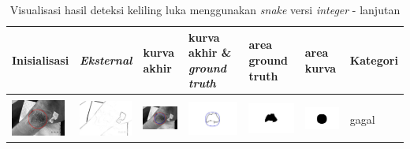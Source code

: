 \begin{table}[H]
	\centering
	\caption{Visualisasi hasil deteksi keliling luka menggunakan \emph{snake} versi \emph{integer} - lanjutan}
	\label{tabel_hasil_6.5}
	\begin{tabular}{|m{0.7in}|m{0.7in}|m{0.7in}|m{0.7in}|m{0.7in}|m{0.7in}|m{0.7in}|}
		\hline
		\textbf{Inisialisasi} & \textbf{\emph{Eksternal}} & \textbf{kurva akhir} & \textbf{kurva akhir \& \emph{ground truth}}& \textbf{area ground truth} & \textbf{area kurva} & \textbf{Kategori} \\
		\hline
	
		&  &  & & & &  \\
		\includegraphics[width=0.7in]{dataset/dataset_3/luka_merah/ready/7_integer_init.jpg}&
		\includegraphics[width=0.7in]{dataset/dataset_3/luka_merah/ready/7_integer_ext.jpg}&
		\includegraphics[width=0.7in]{dataset/dataset_3/luka_merah/ready/7_integer_result.jpg}&
		\includegraphics[width=0.7in]{dataset/dataset_3/luka_merah/ready/7_gt_r_integer.jpg}&
		\includegraphics[width=0.7in]{dataset/dataset_3/luka_merah/ready/7_r.jpg}&
		\includegraphics[width=0.7in]{dataset/dataset_3/luka_merah/ready/7_integer_r.jpg}&
		gagal\\
		\hline
		
	\end{tabular}
\end{table}

